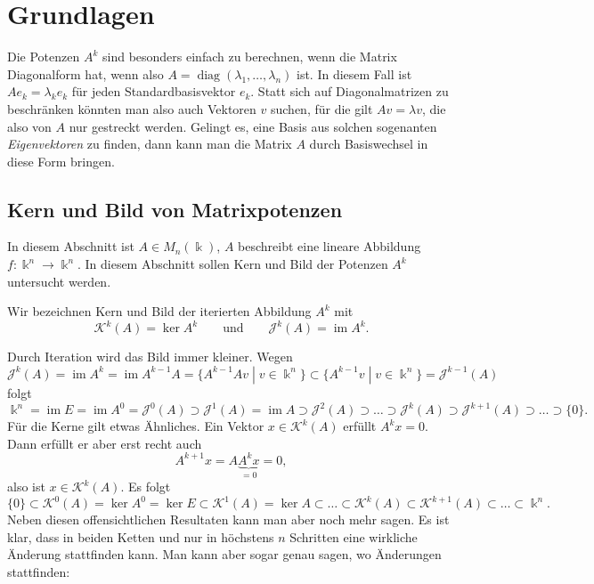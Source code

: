 %
%
%
\section{Grundlagen
\label{buch:section:grundlagen}}
Die Potenzen $A^k$ sind besonders einfach zu berechnen, wenn die Matrix
Diagonalform hat, wenn also $A=\operatorname{diag}(\lambda_1,\dots,\lambda_n)$
ist.
In diesem Fall ist $Ae_k=\lambda_k e_k$ für jeden Standardbasisvektor $e_k$.
Statt sich auf Diagonalmatrizen zu beschränken könnten man also auch
Vektoren $v$ suchen, für die gilt $Av=\lambda v$, die also von $A$ nur
gestreckt werden.
Gelingt es, eine Basis aus solchen sogenanten {\em Eigenvektoren} zu finden,
dann kann man die Matrix $A$ durch Basiswechsel in diese Form bringen.

%
%
\subsection{Kern und Bild von Matrixpotenzen
\label{buch:subsection:kern-und-bild}}
In diesem Abschnitt ist $A\in M_n(\Bbbk)$, $A$ beschreibt eine lineare
Abbildung $f\colon\Bbbk^n\to \Bbbk^n$.
In diesem Abschnitt sollen Kern und Bild der Potenzen $A^k$ untersucht
werden.
\begin{definition}
Wir bezeichnen Kern und Bild der iterierten Abbildung $A^k$ mit
\[
\mathcal{K}^k(A)
=
\ker A^k
\qquad\text{und}\qquad
\mathcal{J}^k(A)
=
\operatorname{im} A^k.
\]
\end{definition}

Durch Iteration wird das Bild immer kleiner.
Wegen
\[
\mathcal{J}^k (A)
=
\operatorname{im} A^k
=
\operatorname{im} A^{k-1} A
=
\{ A^{k-1} Av\;|\; v \in \Bbbk^n\}
\subset
\{ A^{k-1} v\;|\; v \in \Bbbk^n\}
=
\mathcal{J}^{k-1}(A)
\]
folgt
\begin{equation}
\Bbbk^n
=
\operatorname{im}E
=
\operatorname{im}A^0
=
\mathcal{J}^0(A)
\supset
\mathcal{J}^1(A)
=
\operatorname{im}A
\supset
\mathcal{J}^2(A)
\supset\dots\supset
\mathcal{J}^k(A)
\supset
\mathcal{J}^{k+1}(A)
\supset \dots \supset
\{0\}.
\label{buch:eigenwerte:eqn:Jkchain}
\end{equation}
Für die Kerne gilt etwas Ähnliches.
Ein Vektor $x\in \mathcal{K}^k(A)$ erfüllt $A^kx=0$.
Dann erfüllt er aber erst recht auch
\[
A^{k+1}x=A\underbrace{A^kx}_{\displaystyle=0}=0,
\]
also ist $x\in\mathcal{K}^k(A)$.
Es folgt
\begin{equation}
\{0\}
\subset
\mathcal{K}^0(A) = \ker A^0 = \ker E
\subset
\mathcal{K}^1(A) = \ker A
\subset
\dots
\subset
\mathcal{K}^k(A)
\subset
\mathcal{K}^{k+1}(A)
\subset
\dots
\subset
\Bbbk^n.
\label{buch:eigenwerte:eqn:Kkchain}
\end{equation}
Neben diesen offensichtlichen Resultaten kann man aber noch mehr
sagen.
Es ist klar, dass in beiden Ketten
\label{buch:eigenwerte:eqn:Jkchain}
und
\label{buch:eigenwerte:eqn:Kkchain}
nur in höchstens $n$ Schritten eine wirkliche Änderung stattfinden 
kann.
Man kann aber sogar genau sagen, wo Änderungen stattfinden:

